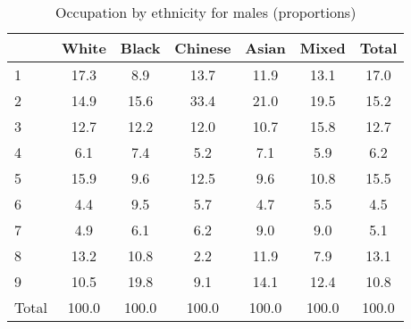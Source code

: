 \begin{table}[htbp]\centering
\def\sym#1{\ifmmode^{#1}\else\(^{#1}\)\fi}
\caption{Occupation by ethnicity for males (proportions)}
\begin{tabular}{l*{6}{c}}
\hline\hline
          &    White&    Black&  Chinese&    Asian&    Mixed&    Total\\
\hline
1         &     17.3&      8.9&     13.7&     11.9&     13.1&     17.0\\
2         &     14.9&     15.6&     33.4&     21.0&     19.5&     15.2\\
3         &     12.7&     12.2&     12.0&     10.7&     15.8&     12.7\\
4         &      6.1&      7.4&      5.2&      7.1&      5.9&      6.2\\
5         &     15.9&      9.6&     12.5&      9.6&     10.8&     15.5\\
6         &      4.4&      9.5&      5.7&      4.7&      5.5&      4.5\\
7         &      4.9&      6.1&      6.2&      9.0&      9.0&      5.1\\
8         &     13.2&     10.8&      2.2&     11.9&      7.9&     13.1\\
9         &     10.5&     19.8&      9.1&     14.1&     12.4&     10.8\\
Total     &    100.0&    100.0&    100.0&    100.0&    100.0&    100.0\\
\hline\hline
\end{tabular}
\label{tab:occup_female}
\end{table}

